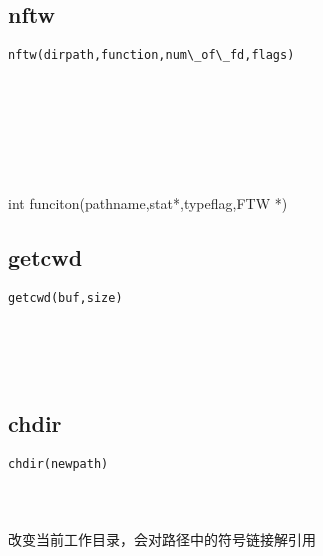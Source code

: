 \documentclass[10pt,a4paper]{article}
\begin{document}
\subsection{nftw}
\begin{spacing}{2.0}
\lstset{language=C,numbers=none}
\begin{lstlisting}
nftw(dirpath,function,num\_of\_fd,flags)
\end{lstlisting}
{\large\color[rgb]{0.2,0.4,0.6}{dirpath:}} \\
{\large\color[rgb]{0.2,0.4,0.6}{function:}} \\
{\large\color[rgb]{0.2,0.4,0.6}{num\_of\_fd:}} \\
{\large\color[rgb]{0.2,0.4,0.6}{flags:}}
\paragraph{ \ \ }int funciton(pathname,stat*,typeflag,FTW *)
\end{spacing}

\subsection{getcwd}
\begin{spacing}{2.0}
\lstset{language=C,numbers=none}
\begin{lstlisting}
getcwd(buf,size)
\end{lstlisting}
{\large\color[rgb]{0.2,0.4,0.6}{buf:}} \\
{\large\color[rgb]{0.2,0.4,0.6}{size:}}
\paragraph{ \ \ }
\end{spacing}

\subsection{chdir}
\begin{spacing}{2.0}
\lstset{language=C,numbers=none}
\begin{lstlisting}
chdir(newpath)
\end{lstlisting}
{\large\color[rgb]{0.2,0.4,0.6}{newpath:}}
\paragraph{ \ \ }改变当前工作目录，会对路径中的符号链接解引用
\end{spacing}
\end{document}
